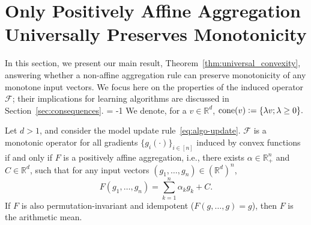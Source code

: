 \documentclass[twoside,11pt]{article}
\newcommand\mb{\mathbb}
\newcommand{\R}{\mathbb{R}}
\newcommand{\F}{\mathcal{F}}
\begin{document}
\section{Only Positively Affine Aggregation Universally Preserves Monotonicity}\label{sec:impossinility}

In this section, we present our main result, Theorem~\ref{thm:universal_convexity}, answering whether a non-affine aggregation rule can preserve monotonicity of any monotone input vectors. 
We focus here on the properties of the induced operator $\F$; their implications for learning algorithms are discussed in Section~\ref{sec:consequences}. \looseness = -1
We denote, for a $v \in \R^d$, $\operatorname{cone}(v) \vcentcolon= \{\lambda v ; \lambda \geq 0\}.$
\begin{theorem}\label{thm:universal_convexity}
    Let $d>1$, and consider the model update rule~\eqref{eq:algo-update}. 
    $\F$ is a monotonic operator for all gradients $\{g_i(\cdot)\}_{i\in[n]}$ induced by convex functions
    if and only if $F$ is a positively affine aggregation, i.e., there exists $\alpha \in \mb{R}_+^n$ and $C \in \mb{R}^d$, such that for any input vectors $(g_1, \ldots, g_n) \in (\mb{R}^d)^n$,
    \[
        F(g_1, \ldots, g_n) = \sum_{k=1}^n \alpha_k g_k + C.
    \]
    If $F$ is also permutation-invariant and idempotent ($F(g, \ldots,g)\! =\! g$), then $F$ is the arithmetic mean.%
\end{theorem}
\end{document}
